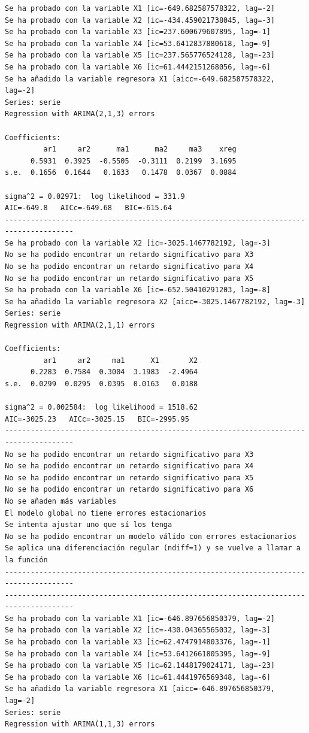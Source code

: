 \documentclass[
  12pt,
  a4paper]{article}
\begin{document}
\begin{verbatim}
Se ha probado con la variable X1 [ic=-649.682587578322, lag=-2]
Se ha probado con la variable X2 [ic=-434.459021738045, lag=-3]
Se ha probado con la variable X3 [ic=237.600679607895, lag=-1]
Se ha probado con la variable X4 [ic=53.6412837880618, lag=-9]
Se ha probado con la variable X5 [ic=237.565776524128, lag=-23]
Se ha probado con la variable X6 [ic=61.4442151268056, lag=-6]
Se ha añadido la variable regresora X1 [aicc=-649.682587578322, lag=-2]
Series: serie 
Regression with ARIMA(2,1,3) errors 

Coefficients:
         ar1     ar2      ma1      ma2     ma3    xreg
      0.5931  0.3925  -0.5505  -0.3111  0.2199  3.1695
s.e.  0.1656  0.1644   0.1633   0.1478  0.0367  0.0884

sigma^2 = 0.02971:  log likelihood = 331.9
AIC=-649.8   AICc=-649.68   BIC=-615.64
--------------------------------------------------------------------------------------
Se ha probado con la variable X2 [ic=-3025.1467782192, lag=-3]
No se ha podido encontrar un retardo significativo para X3
No se ha podido encontrar un retardo significativo para X4
No se ha podido encontrar un retardo significativo para X5
Se ha probado con la variable X6 [ic=-652.50410291203, lag=-8]
Se ha añadido la variable regresora X2 [aicc=-3025.1467782192, lag=-3]
Series: serie 
Regression with ARIMA(2,1,1) errors 

Coefficients:
         ar1     ar2     ma1      X1       X2
      0.2283  0.7584  0.3004  3.1983  -2.4964
s.e.  0.0299  0.0295  0.0395  0.0163   0.0188

sigma^2 = 0.002584:  log likelihood = 1518.62
AIC=-3025.23   AICc=-3025.15   BIC=-2995.95
--------------------------------------------------------------------------------------
No se ha podido encontrar un retardo significativo para X3
No se ha podido encontrar un retardo significativo para X4
No se ha podido encontrar un retardo significativo para X5
No se ha podido encontrar un retardo significativo para X6
No se añaden más variables
El modelo global no tiene errores estacionarios
Se intenta ajustar uno que sí los tenga
No se ha podido encontrar un modelo válido con errores estacionarios
Se aplica una diferenciación regular (ndiff=1) y se vuelve a llamar a la función
--------------------------------------------------------------------------------------
--------------------------------------------------------------------------------------
Se ha probado con la variable X1 [ic=-646.897656850379, lag=-2]
Se ha probado con la variable X2 [ic=-430.04365565032, lag=-3]
Se ha probado con la variable X3 [ic=62.4747914803376, lag=-1]
Se ha probado con la variable X4 [ic=53.6412661805395, lag=-9]
Se ha probado con la variable X5 [ic=62.1448179024171, lag=-23]
Se ha probado con la variable X6 [ic=61.4441976569348, lag=-6]
Se ha añadido la variable regresora X1 [aicc=-646.897656850379, lag=-2]
Series: serie 
Regression with ARIMA(1,1,3) errors 


\end{verbatim}
\end{document}
